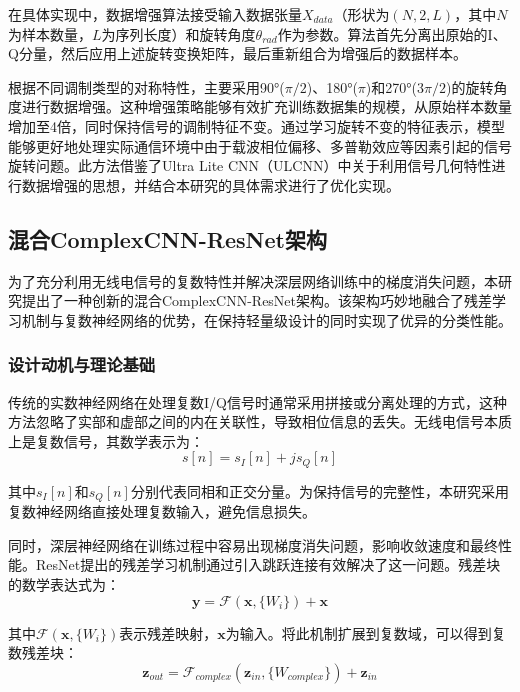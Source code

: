 \documentclass[conference]{IEEEtran}
\begin{document}
在具体实现中，数据增强算法接受输入数据张量$X_{data}$（形状为$(N, 2, L)$，其中$N$为样本数量，$L$为序列长度）和旋转角度$\theta_{rad}$作为参数。算法首先分离出原始的I、Q分量，然后应用上述旋转变换矩阵，最后重新组合为增强后的数据样本。

根据不同调制类型的对称特性，主要采用90°($\pi/2$)、180°($\pi$)和270°($3\pi/2$)的旋转角度进行数据增强。这种增强策略能够有效扩充训练数据集的规模，从原始样本数量增加至4倍，同时保持信号的调制特征不变。通过学习旋转不变的特征表示，模型能够更好地处理实际通信环境中由于载波相位偏移、多普勒效应等因素引起的信号旋转问题。此方法借鉴了Ultra Lite CNN（ULCNN）\cite{b1}中关于利用信号几何特性进行数据增强的思想，并结合本研究的具体需求进行了优化实现。


\subsection{混合ComplexCNN-ResNet架构}

为了充分利用无线电信号的复数特性并解决深层网络训练中的梯度消失问题，本研究提出了一种创新的混合ComplexCNN-ResNet架构。该架构巧妙地融合了残差学习机制与复数神经网络的优势，在保持轻量级设计的同时实现了优异的分类性能。

\subsubsection{设计动机与理论基础}

传统的实数神经网络在处理复数I/Q信号时通常采用拼接或分离处理的方式，这种方法忽略了实部和虚部之间的内在关联性，导致相位信息的丢失。无线电信号本质上是复数信号，其数学表示为：
\begin{equation}
s[n] = s_I[n] + js_Q[n]
\end{equation}

其中$s_I[n]$和$s_Q[n]$分别代表同相和正交分量。为保持信号的完整性，本研究采用复数神经网络直接处理复数输入，避免信息损失。

同时，深层神经网络在训练过程中容易出现梯度消失问题，影响收敛速度和最终性能。ResNet提出的残差学习机制通过引入跳跃连接有效解决了这一问题。残差块的数学表达式为：
\begin{equation}
\mathbf{y} = \mathcal{F}(\mathbf{x}, \{W_i\}) + \mathbf{x}
\end{equation}

其中$\mathcal{F}(\mathbf{x}, \{W_i\})$表示残差映射，$\mathbf{x}$为输入。将此机制扩展到复数域，可以得到复数残差块：
\begin{equation}
\mathbf{z}_{out} = \mathcal{F}_{complex}(\mathbf{z}_{in}, \{W_{complex}\}) + \mathbf{z}_{in}
\end{equation}
\end{document}
